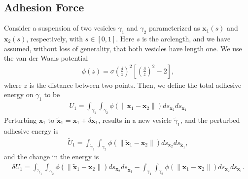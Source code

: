 \documentclass[aps,prl,twocolumn,showpacs,amsmath,amssymb]{revtex4-1}
\newcommand{\xx}{\mathbf{x}}
\begin{document}
\begin{appendices}
\section{Adhesion Force}
\label{sec:appendixA}
Consider a suspension of two vesicles $\gamma_1$ and $\gamma_2$
parameterized as $\xx_1(s)$ and $\xx_2(s)$, respectively, with $s \in
[0,1]$.  Here $s$ is the arclength, and we have assumed, without loss of
generality, that both vesicles have length one.  We use the van der
Waals potential
\begin{align*}
  \phi(z) = \sigma\left(\frac{\delta}{z}\right)^2 \left[ 
    \left(\frac{\delta}{z}\right)^2 - 2 \right],
\end{align*}
where $z$ is the distance between two points.  Then, we define the total
adhesive energy on $\gamma_1$ to be
\begin{align*}
  U_1 = \int_{\gamma_1} \int_{\gamma_2} \phi(\|\xx_1 - \xx_2\|) 
    ds_{\xx_2} ds_{\xx_1}
\end{align*}
Perturbing $\xx_1$ to $\tilde{\xx}_1 = \xx_1 +  \delta \xx_1$, results
in a new vesicle $\tilde{\gamma}_1$, and the perturbed adhesive energy
is
\begin{align*}
  \widetilde{U}_1 = \int_{\tilde{\gamma}_1} \int_{\gamma_2}
  \phi(\|\tilde{\xx}_1 - \xx_2\|) ds_{\xx_2} ds_{\tilde{\xx}_1},
\end{align*}
and the change in the energy is
\begin{align*}
  \delta U_1 = \int_{\tilde{\gamma}_1} \int_{\gamma_2}
  \phi(\|\tilde{\xx}_1 - \xx_2\|) ds_{\xx_2} ds_{\tilde{\xx}_1} - 
  \int_{\gamma_1} \int_{\gamma_2} \phi(\|\xx_1 - \xx_2\|) 
  ds_{\xx_2} ds_{\xx_1}.
\end{align*}


\end{appendices}
\end{document}
